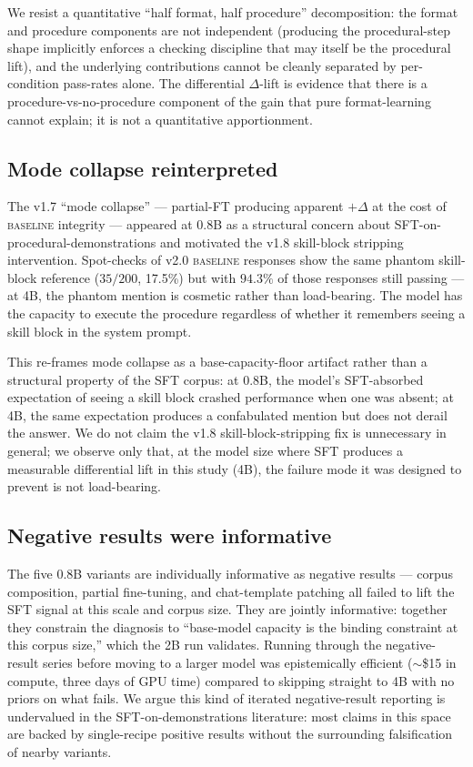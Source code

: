 \documentclass[10pt]{article}
\newcommand{\BL}{\textsc{baseline}\xspace}
\begin{document}
We resist a quantitative ``half format, half procedure'' decomposition: the format and procedure components are not independent (producing the procedural-step shape implicitly enforces a checking discipline that may itself be the procedural lift), and the underlying contributions cannot be cleanly separated by per-condition pass-rates alone. The differential $\Delta$-lift is evidence that there is a procedure-vs-no-procedure component of the gain that pure format-learning cannot explain; it is not a quantitative apportionment.

\subsection{Mode collapse reinterpreted}
The v1.7 ``mode collapse'' --- partial-FT producing apparent $+\Delta$ at the cost of \BL{} integrity --- appeared at 0.8B as a structural concern about SFT-on-procedural-demonstrations and motivated the v1.8 skill-block stripping intervention. Spot-checks of v2.0 \BL{} responses show the same phantom skill-block reference ($35/200$, 17.5\%) but with $94.3\%$ of those responses still passing --- at 4B, the phantom mention is cosmetic rather than load-bearing. The model has the capacity to execute the procedure regardless of whether it remembers seeing a skill block in the system prompt.

This re-frames mode collapse as a base-capacity-floor artifact rather than a structural property of the SFT corpus: at 0.8B, the model's SFT-absorbed expectation of seeing a skill block crashed performance when one was absent; at 4B, the same expectation produces a confabulated mention but does not derail the answer. We do not claim the v1.8 skill-block-stripping fix is unnecessary in general; we observe only that, at the model size where SFT produces a measurable differential lift in this study (4B), the failure mode it was designed to prevent is not load-bearing.

\subsection{Negative results were informative}
The five 0.8B variants are individually informative as negative results --- corpus composition, partial fine-tuning, and chat-template patching all failed to lift the SFT signal at this scale and corpus size. They are jointly informative: together they constrain the diagnosis to ``base-model capacity is the binding constraint at this corpus size,'' which the 2B run validates. Running through the negative-result series before moving to a larger model was epistemically efficient ($\sim$\$15 in compute, three days of GPU time) compared to skipping straight to 4B with no priors on what fails. We argue this kind of iterated negative-result reporting is undervalued in the SFT-on-demonstrations literature: most claims in this space are backed by single-recipe positive results without the surrounding falsification of nearby variants.
\end{document}
